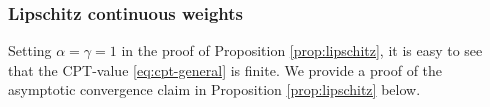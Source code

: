 \subsubsection{Lipschitz continuous weights}
\label{sec:lipschitz-proofs}
 Setting $\alpha=\gamma=1$ in the proof of Proposition \ref{prop:lipschitz}, it is easy to see that the CPT-value \eqref{eq:cpt-general} is finite. We provide a proof of the asymptotic convergence claim in Proposition \ref{prop:lipschitz} below.
